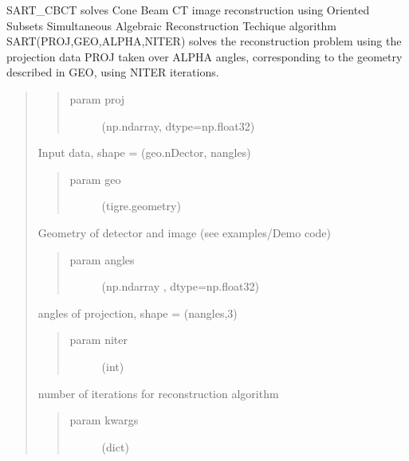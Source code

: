 \documentclass[letterpaper,10pt,english]{sphinxmanual}
\begin{document}
\begin{fulllineitems}
\label{\detokenize{index:tigre.algorithms.sart}}
SART\_CBCT solves Cone Beam CT image reconstruction using Oriented Subsets
Simultaneous Algebraic Reconstruction Techique algorithm
SART(PROJ,GEO,ALPHA,NITER) solves the reconstruction problem
using the projection data PROJ taken over ALPHA angles, corresponding
to the geometry described in GEO, using NITER iterations.
\begin{quote}
\begin{quote}\begin{description}
\item[{param proj}] \leavevmode
(np.ndarray, dtype=np.float32)

\end{description}\end{quote}

Input data, shape = (geo.nDector, nangles)
\begin{quote}\begin{description}
\item[{param geo}] \leavevmode
(tigre.geometry)

\end{description}\end{quote}

Geometry of detector and image (see examples/Demo code)
\begin{quote}\begin{description}
\item[{param angles}] \leavevmode
(np.ndarray , dtype=np.float32)

\end{description}\end{quote}

angles of projection, shape = (nangles,3)
\begin{quote}\begin{description}
\item[{param niter}] \leavevmode
(int)

\end{description}\end{quote}

number of iterations for reconstruction algorithm
\begin{quote}\begin{description}
\item[{param kwargs}] \leavevmode
(dict)


\end{description}
\end{quote}
\end{quote}
\end{fulllineitems}
\end{document}

